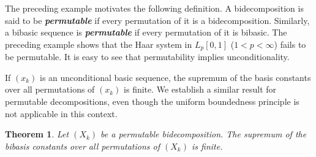 \documentclass[12pt]{amsart}
\theoremstyle{plain}
\newtheorem{theorem}{Theorem}[section]
\theoremstyle{definition}
\newcommand{\term}[1]{{\textit{\textbf{#1}}}}   %
\begin{document}
The preceding example motivates the following definition. A
bidecomposition is said to be \term{permutable} if every permutation
of it is a bidecomposition. Similarly, a bibasic sequence is
\term{permutable} if every permutation of it is bibasic. The preceding
example shows that the Haar system in $L_p[0,1]$ ($1<p<\infty$) fails
to be permutable. It is easy to see that permutability implies
unconditionality. 

If $(x_k)$ is an unconditional basic sequence, the supremum of the
basis constants over all permutations of $(x_k)$ is finite. We
establish a similar result for permutable decompositions, even though
the uniform boundedness principle is not applicable in this context.

\begin{theorem}\label{perm-const}
  Let $(X_k)$ be a permutable bidecomposition. The supremum of the
  bibasis constants over all permutations of $(X_k)$ is finite.
\end{theorem}
\end{document}
